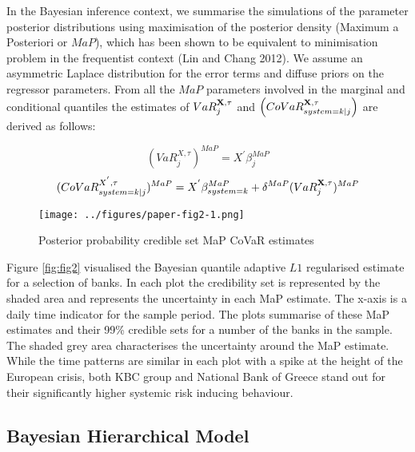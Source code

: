 \documentclass[
  10pt,
]{article}
\begin{document}
In the Bayesian inference context, we summarise the simulations of the
parameter posterior distributions using maximisation of the posterior
density (Maximum a Posteriori or \(MaP\)), which has been shown to be
equivalent to minimisation problem in the frequentist context (Lin and
Chang 2012). We assume an asymmetric Laplace distribution for the error
terms and diffuse priors on the regressor parameters. From all the
\(MaP\) parameters involved in the marginal and conditional quantiles
the estimates of \(VaR^{\bf{X},\tau}_j\) and
\(\left( CoVaR_{system=k|j}^{\bf{X},\tau} \right)\) are derived as
follows:

\begin{equation}\label{eq:eq6}
(VaR^{X,\tau}_j)^{MaP} = X^{'}\beta_j^{MaP}
\end{equation} \begin{equation}\label{eq:eq7}
(CoVaR_{system=k|j}^{X^{'},\tau})^{MaP} = X^{'} \beta_{system=k}^{MaP}+\delta^{MaP}(VaR^{\bf{X},\tau}_j)^{MaP}
\end{equation}

\begin{figure}
\centering
\texttt{[image: ../figures/paper-fig2-1.png]}
\caption{Posterior probability credible set MaP CoVaR estimates}
\end{figure}

Figure \ref{fig:fig2} visualised the Bayesian quantile adaptive \(L1\)
regularised estimate for a selection of banks. In each plot the
credibility set is represented by the shaded area and represents the
uncertainty in each MaP estimate. The x-axis is a daily time indicator
for the sample period. The plots summarise of these MaP estimates and
their 99\% credible sets for a number of the banks in the sample. The
shaded grey area characterises the uncertainty around the MaP estimate.
While the time patterns are similar in each plot with a spike at the
height of the European crisis, both KBC group and National Bank of
Greece stand out for their significantly higher systemic risk inducing
behaviour.

\hypertarget{bayesian-hierarchical-model}{%
\subsection{Bayesian Hierarchical
Model}\label{bayesian-hierarchical-model}}
\end{document}
